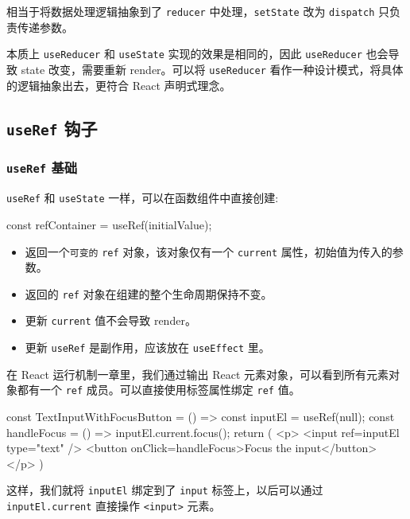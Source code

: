 相当于将数据处理逻辑抽象到了 \texttt{reducer} 中处理，\texttt{setState} 改为 \texttt{dispatch} 只负责传递参数。

本质上 \texttt{useReducer} 和 \texttt{useState} 实现的效果是相同的，因此 \texttt{useReducer} 也会导致 state 改变，需要重新 render。可以将 \texttt{useReducer} 看作一种设计模式，将具体的逻辑抽象出去，更符合 React 声明式理念。 

\subsection{\texttt{useRef} 钩子}

\subsubsection{\texttt{useRef} 基础}

\texttt{useRef} 和 \texttt{useState} 一样，可以在函数组件中直接创建:

\begin{JavaScript}
const refContainer = useRef(initialValue);
\end{JavaScript}

\begin{itemize}
    \item 返回一个\texttt{可变的} \texttt{ref} 对象，该对象仅有一个 \texttt{current} 属性，初始值为传入的参数。
    \item 返回的 \texttt{ref} 对象在组建的整个生命周期保持不变。
    \item 更新 \texttt{current} 值不会导致 render。
    \item 更新 \texttt{useRef} 是副作用，应该放在 \texttt{useEffect} 里。
\end{itemize}

在 React 运行机制一章里，我们通过输出 React 元素对象，可以看到所有元素对象都有一个 \texttt{ref} 成员。可以直接使用标签属性绑定 \texttt{ref} 值。

\begin{JavaScript}
const TextInputWithFocusButton = () => {
   const inputEl = useRef(null);
   const handleFocus = () => {
       inputEl.current.focus();
   }
   return (
       <p>
           <input ref={inputEl} type="text" />
           <button onClick={handleFocus}>Focus the input</button>
       </p>
   )
}
\end{JavaScript}

这样，我们就将 \texttt{inputEl} 绑定到了 \texttt{input} 标签上，以后可以通过 \texttt{inputEl.current} 直接操作 \texttt{<input>} 元素。


